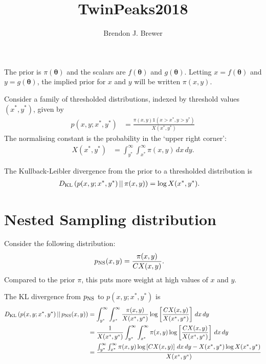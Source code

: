 \documentclass[a4paper, 12pt]{article}
\title{TwinPeaks2018}
\author{Brendon J. Brewer}
\newcommand{\btheta}{\boldsymbol{\theta}}
\begin{document}
\maketitle


\setlength{\parindent}{0pt}
\setlength{\parskip}{8pt}

The prior is $\pi(\btheta)$ and the scalars are
$f(\btheta)$ and $g(\btheta)$. Letting $x=f(\btheta)$ and $y=g(\btheta)$,
the implied prior for $x$ and $y$ will be written $\pi(x, y)$.

Consider a family of thresholded distributions, indexed by threshold
values $(x^*, y^*)$, given by
\begin{align}
p(x, y; x^*, y^*) &= \frac{\pi(x, y)\mathds{1}(x > x^*, y > y^*)}
                          {X(x^*, y^*)}
\end{align}
The normalising constant is the probability in the `upper right corner':
\begin{align}
X(x^*, y^*) &= \int_{y^*}^{\infty} \int_{x^*}^{\infty} \pi(x, y) \, dx \, dy.
\end{align}

The Kullback-Leibler divergence from the prior to a thresholded distribution
is
\begin{align}
D_{\rm KL}\left(p(x, y; x^*, y^*) \,||\, \pi(x, y)\right) &=
    \log X(x^*, y^*).
\end{align}

\section{Nested Sampling distribution}
Consider the following distribution:
\begin{align}
p_{\rm NS}(x, y) &= \frac{\pi(x, y)}{C X(x, y)}.
\end{align}
Compared to the prior $\pi$, this puts more weight at high values of
$x$ and $y$.

The KL divergence from $p_{\rm NS}$ to $p(x, y ; x^*, y^*)$ is
\begin{align}
D_{\rm KL}\left(p(x, y; x^*, y^*) \,||\, p_{\rm NS}(x, y)\right)
&=
\int_{y^*}^{\infty} \int_{x^*}^{\infty}
    \frac{\pi(x, y)}{X(x^*, y^*)}
    \log \left[\frac{C X(x, y)}{X(x^*, y^*)}\right]
    \, dx \, dy \\
&=
\frac{1}{X(x^*, y^*)}
\int_{y^*}^{\infty} \int_{x^*}^{\infty}
    \pi(x, y)
    \log \left[\frac{C X(x, y)}{X(x^*, y^*)}\right]
    \, dx \, dy \\
&=
\frac{\int_{y^*}^{\infty} \int_{x^*}^{\infty}
     \pi(x, y)
     \log \left[C X(x, y)\right]
     \, dx \, dy - X(x^*, y^*)\log X(x^*, y^*)}
     {X(x^*, y^*)}
\end{align}
\end{document}
